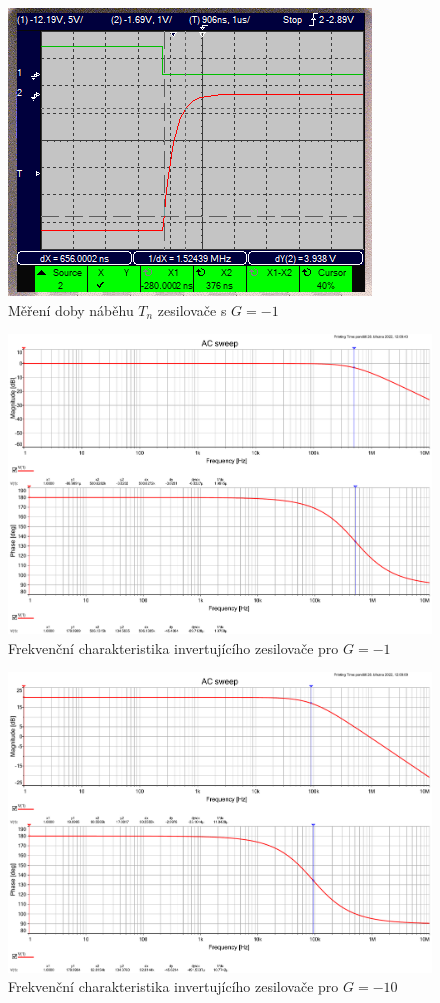 \documentclass[twoside]{article}
\begin{document}
\begin{figure}[h!]
    \centering
    \includegraphics[width=0.35\linewidth]{inv_rise_time_1.png}
    \caption{Měření doby náběhu $T_n$ zesilovače s $G=-1$}
    \label{fig:inv_rise_time_1}
\end{figure}

\begin{figure}
    \centering
    \includegraphics[width=0.92\linewidth]{bode_inv_1.pdf}
    \caption{Frekvenční charakteristika invertujícího zesilovače pro $G=-1$}
    \label{fig:bode_inv_1}
\end{figure}

\begin{figure}
    \centering
    \includegraphics[width=0.92\linewidth]{bode_inv_10.pdf}
    \caption{Frekvenční charakteristika invertujícího zesilovače pro $G=-10$}
    \label{fig:bode_inv_10}
\end{figure}
\end{document}
